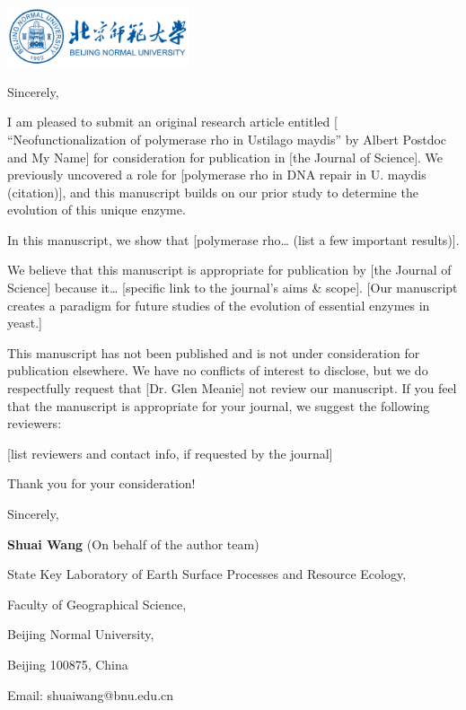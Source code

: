 \documentclass[11pt,a4paper,roman]{moderncv}
\begin{document}
\begin{minipage}[t]{\textwidth}
\includegraphics[width=0.40\textwidth]{bnu}
\end{minipage}


\opening{\vspace*{-2em}}
\closing{Sincerely,}{\vspace*{-2em}}
\makelettertitle

I am pleased to submit an original research article entitled [ “Neofunctionalization of polymerase rho in Ustilago maydis” by Albert Postdoc and My Name] for consideration for publication in [the Journal of Science].  We previously uncovered a role for [polymerase rho in DNA repair in U. maydis (citation)], and this manuscript builds on our prior study to determine the evolution of this unique enzyme.

In this manuscript, we show that [polymerase rho… (list a few important results)].

We believe that this manuscript is appropriate for publication by [the Journal of Science] because it… [specific link to the journal’s aims \& scope].  [Our manuscript creates a paradigm for future studies of the evolution of essential enzymes in yeast.]

This manuscript has not been published and is not under consideration for publication elsewhere.  We have no conflicts of interest to disclose, but we do respectfully request that [Dr. Glen Meanie] not review our manuscript.  If you feel that the manuscript is appropriate for your journal, we suggest the following reviewers:

[list reviewers and contact info, if requested by the journal]

\vspace{0.5cm}

Thank you for your consideration!

\vspace{0.5cm}

Sincerely,

\textbf{Shuai Wang} (On behalf of the author team)


State Key Laboratory of Earth Surface Processes and Resource Ecology,

Faculty of Geographical Science,

Beijing Normal University,

Beijing 100875, China

Email: shuaiwang@bnu.edu.cn
\end{document}
